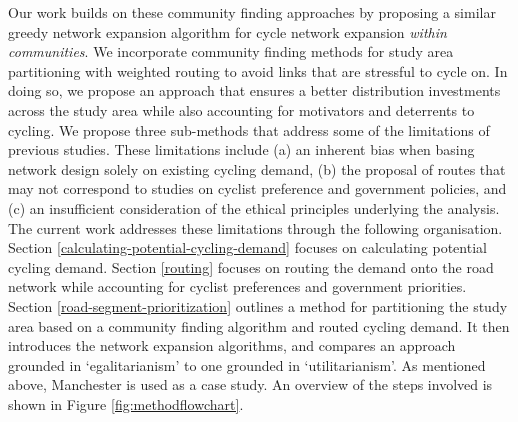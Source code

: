 \documentclass[
]{article}
\begin{document}
Our work builds on these community finding approaches by proposing a similar greedy network expansion algorithm for cycle network expansion \emph{within communities}.
We incorporate community finding methods for study area partitioning with weighted routing to avoid links that are stressful to cycle on.
In doing so, we propose an approach that ensures a better distribution investments across the study area while also accounting for motivators and deterrents to cycling.
We propose three sub-methods that address some of the limitations of previous studies.
These limitations include (a) an inherent bias when basing network design solely on existing cycling demand, (b) the proposal of routes that may not correspond to studies on cyclist preference and government policies, and (c) an insufficient consideration of the ethical principles underlying the analysis.
The current work addresses these limitations through the following organisation.
Section \ref{calculating-potential-cycling-demand} focuses on calculating potential cycling demand.
Section \ref{routing} focuses on routing the demand onto the road network while accounting for cyclist preferences and government priorities.
Section \ref{road-segment-prioritization} outlines a method for partitioning the study area based on a community finding algorithm and routed cycling demand.
It then introduces the network expansion algorithms, and compares an approach grounded in `egalitarianism' to one grounded in `utilitarianism'.
As mentioned above, Manchester is used as a case study.
An overview of the steps involved is shown in Figure \ref{fig:methodflowchart}.
\end{document}
